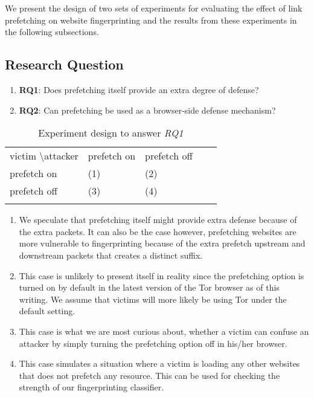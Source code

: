 We present the design of two sets of experiments for evaluating the effect of link
prefetching on website fingerprinting and the results from these
experiments in the following subsections.
\subsection{Research Question}

\begin{enumerate}
\item
{\bf RQ1}: Does prefetching itself provide an extra degree of defense?
\item
{\bf RQ2}: Can prefetching be used as a browser-side defense mechanism?
\end{enumerate}


\begin{table}[]
\centering
\caption{Experiment design to answer {\it RQ1}}
\label{table:prefetch}
\begin{tabular}{lllll}
\cline{1-3}
\multicolumn{1}{|l|}{victim \textbackslash attacker} & \multicolumn{1}{l|}{prefetch on} & \multicolumn{1}{l|}{prefetch off} &  &  \\ \cline{1-3}
\multicolumn{1}{|l|}{prefetch on}                    & \multicolumn{1}{l|}{(1)}         & \multicolumn{1}{l|}{(2)}          &  &  \\ \cline{1-3}
\multicolumn{1}{|l|}{prefetch off}                   & \multicolumn{1}{l|}{(3)}         & \multicolumn{1}{l|}{(4)}          &  &  \\ \cline{1-3}
                                                     &                                  &                                   &  & 
\end{tabular}                  
\end{table}

\begin{enumerate}
\item
We speculate that prefetching itself might provide extra defense because of the extra packets.
It can also be the case however, prefetching websites are more
vulnerable to fingerprinting because of the extra prefetch upstream and
downstream packets that
creates a distinct suffix.
\item
This case is unlikely to present itself in reality since the prefetching option is turned on by
default in the latest version of the Tor browser as of this writing. We assume that victims will more likely be using Tor under the default setting.
\item
This case is what we are most curious about, whether a victim can
confuse an attacker by simply turning the prefetching option off in
his/her browser.
\item
This case simulates a situation where a victim is loading any other websites that does not prefetch any resource.
This can be used for checking the strength of our fingerprinting
classifier.
\end{enumerate}

